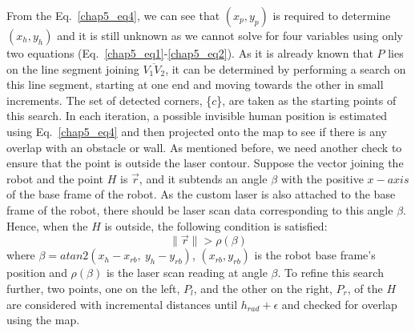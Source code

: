 From the Eq.~\eqref{chap5_eq4}, we can see that $(x_p,y_p)$ is required to determine $(x_h,y_h)$ and it is still unknown as we cannot solve for four variables using only two equations (Eq.~\eqref{chap5_eq1}-\eqref{chap5_eq2}). As it is already known that $P$ lies on the line segment joining $\overline{V_1V_2}$, it can be determined by performing a search on this line segment, starting at one end and moving towards the other in small increments. The set of detected corners, \{$c$\}, are taken as the starting points of this search. In each iteration, a possible invisible human position is estimated using Eq.~\eqref{chap5_eq4} and then projected onto the map to see if there is any overlap with an obstacle or wall. As mentioned before, we need another check to ensure that the point is outside the laser contour. Suppose the vector joining the robot and the point $H$ is $\overrightarrow{r}$, and it subtends an angle $\beta$ with the positive $x-axis$ of the base frame of the robot. As the custom laser is also attached to the base frame of the robot, there should be laser scan data corresponding to this angle $\beta$. Hence, when the $H$ is outside, the following condition is satisfied:
\begin{equation}
    \lVert\overrightarrow{r}\rVert > \rho(\beta)
\end{equation}
where $\beta = atan2(x_h - x_{rb},\ y_h-y_{rb})$, $(x_{rb}, y_{rb})$ is the robot base frame's position and $\rho(\beta)$ is the laser scan reading at angle $\beta$. To refine this search further, two points, one on the left, $P_l$, and the other on the right, $P_r$, of the $H$ are considered with incremental distances until $h_{rad}+\epsilon$ and checked for overlap using the map. 

